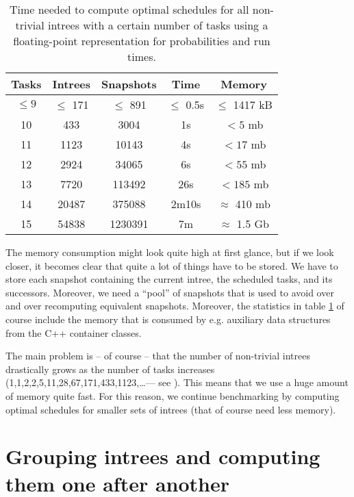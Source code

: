 \begin{table}[ht]
  \centering
  \begin{tabular}[ht]{ccccc}
    Tasks & Intrees & Snapshots & Time & Memory \\
    \hline{}
    $\leq 9$ & $\leq$ 171 & $\leq$ 891 & $\leq$ 0.5s & $\leq$ 1417 kB \\
    10 & 433 & 3004 & 1s & $<5$ mb \\
    11 & 1123 & 10143 & 4s & $<17$ mb \\
    12 & 2924 & 34065 & 6s & $<55$ mb \\
    13 & 7720 & 113492 & 26s & $<185$ mb \\
    14 & 20487 & 375088 & 2m10s & $\approx$ 410 mb \\
    15 & 54838 & 1230391 & 7m & $\approx$ 1.5 Gb \\
    
  \end{tabular}
  \caption{Time needed to compute optimal schedules for all non-trivial intrees with a certain number of tasks using a floating-point representation for probabilities and run times.}
  \label{tab:time-benchmark}
\end{table}

The memory consumption might look quite high at first glance, but if we look closer, it becomes clear that quite a lot of things have to be stored. We have to store each snapshot containing the current intree, the scheduled tasks, and its successors. Moreover, we need a ``pool'' of snapshots that is used to avoid over and over recomputing equivalent snapshots. Moreover, the statistics in table \ref{tab:time-benchmark} of course include the memory that is consumed by e.g. auxiliary data structures from the C++ container classes.

The main problem is -- of course -- that the number of non-trivial intrees drastically grows as the number of tasks increases (1,1,2,2,5,11,28,67,171,433,1123,\dots --- see \cite{oeisnumbernontrivialintrees}). This means that we use a huge amount of memory quite fast. For this reason, we continue benchmarking by computing optimal schedules for smaller sets of intrees (that of course need less memory).

\section{Grouping intrees and computing them one after another}
\label{sec:benchmarks-clustered-intrees}


